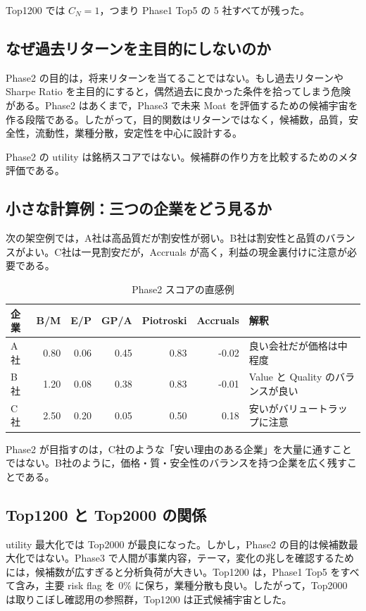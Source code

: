 \documentclass[a4paper,10pt]{article}
\newcommand{\1}{\mathbf{1}}
\begin{document}
Top1200 では $C_N=1$，つまり Phase1 Top5 の 5 社すべてが残った。

\subsection{なぜ過去リターンを主目的にしないのか}
Phase2 の目的は，将来リターンを当てることではない。もし過去リターンや Sharpe Ratio を主目的にすると，偶然過去に良かった条件を拾ってしまう危険がある。Phase2 はあくまで，Phase3 で未来 Moat を評価するための候補宇宙を作る段階である。したがって，目的関数はリターンではなく，候補数，品質，安全性，流動性，業種分散，安定性を中心に設計する。

\begin{keybox}
Phase2 の utility は銘柄スコアではない。候補群の作り方を比較するためのメタ評価である。
\end{keybox}

\subsection{小さな計算例：三つの企業をどう見るか}
次の架空例では，A社は高品質だが割安性が弱い。B社は割安性と品質のバランスがよい。C社は一見割安だが，Accruals が高く，利益の現金裏付けに注意が必要である。

\begin{table}[tbp]
\caption{Phase2 スコアの直感例}
\label{tab:toy-example}
\centering
\begin{tabular}{lrrrrrl}
\toprule
企業 & B/M & E/P & GP/A & Piotroski & Accruals & 解釈 \\
\midrule
A社 & 0.80 & 0.06 & 0.45 & 0.83 & -0.02 & 良い会社だが価格は中程度 \\
B社 & 1.20 & 0.08 & 0.38 & 0.83 & -0.01 & Value と Quality のバランスが良い \\
C社 & 2.50 & 0.20 & 0.05 & 0.50 & 0.18 & 安いがバリュートラップに注意 \\
\bottomrule
\end{tabular}
\end{table}

Phase2 が目指すのは，C社のような「安い理由のある企業」を大量に通すことではない。B社のように，価格・質・安全性のバランスを持つ企業を広く残すことである。

\subsection{Top1200 と Top2000 の関係}
utility 最大化では Top2000 が最良になった。しかし，Phase2 の目的は候補数最大化ではない。Phase3 で人間が事業内容，テーマ，変化の兆しを確認するためには，候補数が広すぎると分析負荷が大きい。Top1200 は，Phase1 Top5 をすべて含み，主要 risk flag を 0\% に保ち，業種分散も良い。したがって，Top2000 は取りこぼし確認用の参照群，Top1200 は正式候補宇宙とした。
\end{document}
